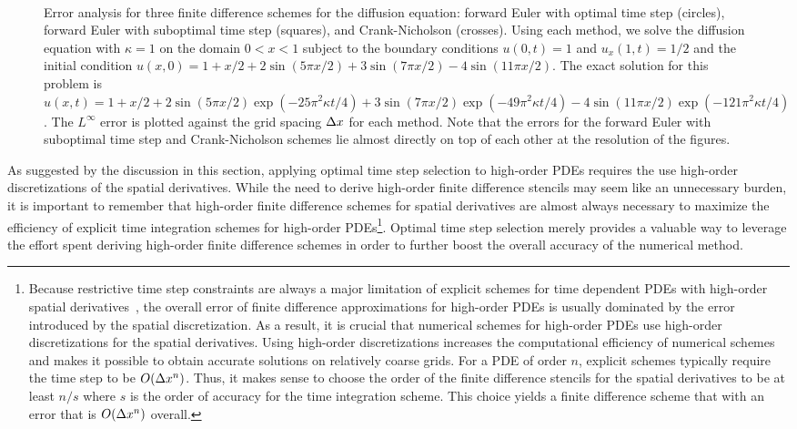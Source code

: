 \documentclass[oneeqnum,onefignum,onetabnum,onethmnum]{siamltex}
\begin{document}
\begin{figure}[htb]
\begin{center}
\ \ 
\caption{Error analysis for three finite difference schemes for the 
diffusion equation: forward Euler with optimal time step (circles), forward 
Euler with suboptimal time step (squares), and Crank-Nicholson (crosses).  
Using each method, we solve the diffusion equation with $\kappa = 1$ on the 
domain $0 < x < 1$ subject to the boundary conditions 
$u(0,t) = 1$ and $u_x(1,t) = 1/2$ 
and the initial condition
$u(x,0) = 1 + x/2 + 2 \sin(5 \pi x/2) + 3 \sin(7 \pi x/2) 
- 4 \sin(11 \pi x/2)$.  
The exact solution for this problem is
$u(x,t) = 1 + x/2 
        + 2 \sin(5 \pi x/2)  \exp(-25 \pi^2 \kappa t/4) 
        + 3 \sin(7 \pi x/2)  \exp(-49 \pi^2 \kappa t/4)
        - 4 \sin(11 \pi x/2) \exp(-121 \pi^2 \kappa t/4)$.
The $L^\infty$ error is plotted against the grid spacing $\Delta x$ for each 
method.  Note that the errors for the forward Euler with suboptimal time 
step and Crank-Nicholson schemes lie almost directly on top of each other
at the resolution of the figures.
}
\label{fig:4th_order_parabolic_eqn_1d_error}
\end{center}
\end{figure}

As suggested by the discussion in this section, applying optimal time step 
selection to high-order PDEs requires the use high-order discretizations
of the spatial derivatives.  While the need to derive high-order finite 
difference stencils may seem like an unnecessary burden, it is important
to remember that high-order finite difference schemes for spatial derivatives
are almost always necessary to maximize the efficiency of explicit time
integration schemes for high-order PDEs\footnote{Because restrictive time 
step constraints are always a major limitation of explicit schemes for 
time dependent PDEs with high-order spatial 
derivatives~\cite{gko_book,greer_2006}, 
the overall error of finite difference approximations for high-order PDEs
is usually dominated by the error introduced by the spatial discretization.
As a result, it is crucial that numerical schemes for high-order PDEs use 
high-order discretizations for the spatial derivatives.  Using high-order 
discretizations increases the computational efficiency of numerical schemes 
and makes it possible to obtain accurate solutions on relatively coarse 
grids.  For a PDE of order $n$, explicit schemes typically require 
the time step to be $O(\Delta x^n)$.  Thus, it makes sense to choose the order of 
the finite difference stencils for the spatial derivatives to be at least 
$n/s$ where $s$ is the order of accuracy for the time integration scheme.  
This choice yields a finite difference scheme that with an error that is
$O(\Delta x^n)$ overall.}.  
Optimal time step selection merely provides a valuable way to leverage the 
effort spent deriving high-order finite difference schemes in order to further 
boost the overall accuracy of the numerical method.
\end{document}
